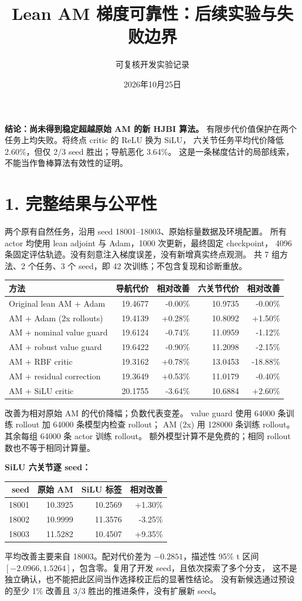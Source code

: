 \documentclass[10pt,a4paper]{article}
\title{Lean AM 梯度可靠性：后续实验与失败边界}
\author{可复核开发实验记录}\date{2026年10月25日}
\begin{document}
\maketitle\vspace{-1em}
\textbf{结论：尚未得到稳定超越原始 AM 的新 HJBI 算法。}
有限步代价值保护在两个任务上均失败。将终点 critic 的 ReLU 换为 SiLU，
六关节任务平均代价降低 2.60\%，但仅 2/3 seed 胜出；导航恶化 3.64\%。
这是一条梯度估计的局部线索，不能当作鲁棒算法有效性的证明。
\section*{1. 完整结果与公平性}
两个原有自然任务，沿用 seed 18001--18003、原始标量数据及环境配置。
所有 actor 均使用 lean adjoint 与 Adam，1000 次更新，最终固定 checkpoint，
4096 条固定评估轨迹。没有刻意注入梯度误差，没有新增真实终点观测。
共 7 组方法、2 个任务、3 个 seed，即 42 次训练；不包含复现和诊断重放。
\begin{center}\small
\begin{tabular}{lrrrr}\toprule
方法 & 导航代价 & 相对改善 & 六关节代价 & 相对改善\\\midrule
Original lean AM + Adam & 19.4677 & -0.00\% & 10.9735 & -0.00\% \\
AM + Adam (2x rollouts) & 19.4139 & +0.28\% & 10.8092 & +1.50\% \\
AM + nominal value guard & 19.6124 & -0.74\% & 11.0959 & -1.12\% \\
AM + robust value guard & 19.6422 & -0.90\% & 11.2098 & -2.15\% \\
AM + RBF critic & 19.3162 & +0.78\% & 13.0453 & -18.88\% \\
AM + residual correction & 19.3649 & +0.53\% & 11.0179 & -0.40\% \\
AM + SiLU critic & 20.1755 & -3.64\% & 10.6884 & +2.60\% \\
\bottomrule\end{tabular}\end{center}
改善为相对原始 AM 的代价降幅；负数代表变差。
value guard 使用 64000 条训练 rollout 加 64000 条模型内检查 rollout；
AM (2x) 用 128000 条训练 rollout。其余每组 64000 条 actor 训练 rollout。
额外模型计算不是免费的；相同 rollout 数也不等于相同计算量。

\textbf{SiLU 六关节逐 seed：}
\begin{center}\begin{tabular}{rrrr}\toprule
seed & 原始 AM & SiLU 标签 & 相对改善\\\midrule
18001 & 10.3925 & 10.2569 & +1.30\% \\
18002 & 10.9999 & 11.3576 & -3.25\% \\
18003 & 11.5282 & 10.4507 & +9.35\% \\
\bottomrule\end{tabular}\end{center}
平均改善主要来自 18003。配对代价差为 $-0.2851$，描述性 95\% t 区间
$[-2.0966,1.5264]$，包含零。复用了开发 seed，且依次探索了多个分支，
这不是独立确认，也不能把此区间当作选择校正后的显著性结论。
没有新候选通过预设的至少 1\% 改善且 3/3 胜出的推进条件，没有扩展新 seed。
\newpage
\end{document}
